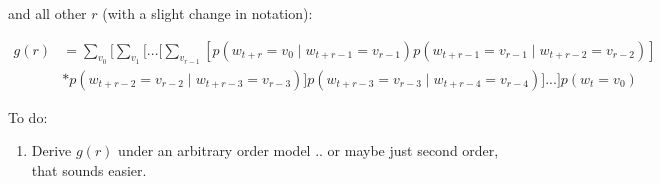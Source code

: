 \documentclass[11pt,letterpaper]{article}
\theoremstyle{definition}
\begin{document}
and all other $r$ (with a slight change in notation):

\begin{align} g(r) &= \sum_{v_0}[ \sum_{v_1} [ ... [ \sum_{v_{r-1}} [ p(w_{t+r} = v_0 \mid w_{t+r-1} = v_{r-1}) p(w_{t+r-1} = v_{r-1} \mid w_{t+r-2} = v_{r-2})] \\
&* p(w_{t+r-2} = v_{r-2} \mid w_{t+r-3} = v_{r-3})] p(w_{t+r-3} = v_{r-3} \mid w_{t+r-4} = v_{r-4})] ... ] p(w_t = v_0) 
\end{align}








To do:
\begin{enumerate}
\item Derive $g(r)$ under an arbitrary order model .. or maybe just second order, that sounds easier.
\end{enumerate}


% 
% 
\end{document}
